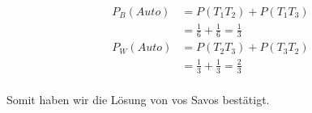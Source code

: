 \begin{equation}
    \begin{split}
        P_B(Auto) & = P(T_1T_2) + P(T_1T_3) \\
        & = \frac{1}{6} + \frac{1}{6} = \frac{1}{3} \\
        P_W(Auto) & = P(T_2T_3) + P(T_3T_2) \\
        &= \frac{1}{3} + \frac{1}{3} = \frac{2}{3} \\
    \end{split}
\end{equation}

Somit haben wir die Lösung von vos Savos bestätigt.


